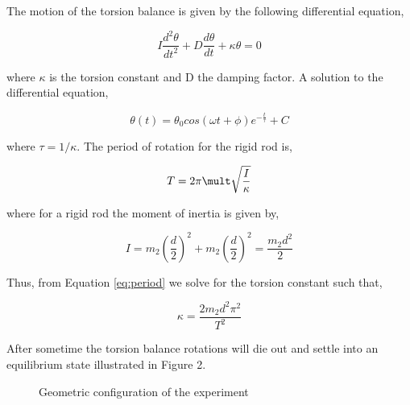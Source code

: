 \documentclass[twoside,twocolumn]{article}
\begin{document}
The motion of the torsion balance is given by the following differential equation,

\begin{equation}
\label{eq:diff_eq}
  I\frac{d^2\theta}{dt^2} + D\frac{d\theta}{dt} + \kappa \theta = 0
\end{equation}

where $\kappa$ is the torsion constant and D the damping factor. A solution to the differential
equation,

\begin{equation}
\label{eq:diff_sol}
\theta(t) = \theta_{0}cos(\omega t + \phi)e^{-\frac{t}{\tau}} + C
\end{equation}

where $\tau = 1 / \kappa $. The period of rotation for the rigid rod is,

\begin{equation}
\label{eq:period}
T = 2\pi \mult \sqrt{\frac{I}{\kappa}}
\end{equation}

where for a rigid rod the moment of inertia is given by,

\begin{equation}
\label{eq:inertia}
I = m_{2}(\frac{d}{2})^2 + m_{2}(\frac{d}{2})^2 = \frac{m_{2}d^2}{2}
\end{equation}

Thus, from Equation \ref{eq:period} we solve for the torsion constant such that,

\begin{equation}
\label{eq:kappa}
\kappa = \frac{2m_{2}d^2\pi^2}{T^2}
\end{equation}

After sometime the torsion balance rotations will die out and settle into an equilibrium state illustrated in
Figure 2.

\begin{figure}[H]
\centering
  \begin{center}
  \end{center}
  \caption{Geometric configuration of the experiment}
\end{figure}
\label{fig:geometry}
\end{document}
